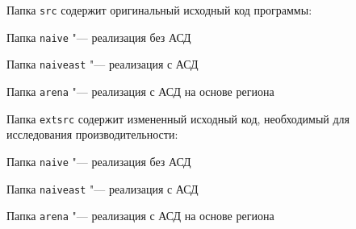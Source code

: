 Папка \verb|src| содержит оригинальный исходный код программы:

Папка \verb|naive| "--- реализация без АСД

Папка \verb|naiveast| "--- реализация с АСД

Папка \verb|arena| "--- реализация с АСД на основе региона

Папка \verb|extsrc| содержит измененный исходный код, необходимый для исследования производительности:

Папка \verb|naive| "--- реализация без АСД

Папка \verb|naiveast| "--- реализация с АСД

Папка \verb|arena| "--- реализация с АСД на основе региона
